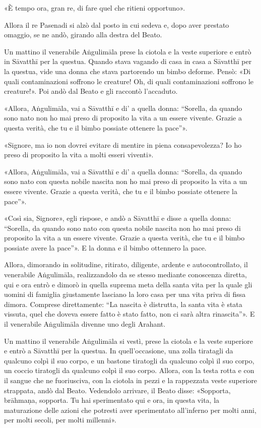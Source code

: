 «È tempo ora, gran re, di fare quel che ritieni opportuno».

Allora il re Pasenadi si alzò dal posto in cui sedeva e, dopo aver prestato
omaggio, se ne andò, girando alla destra del Beato.

Un mattino il venerabile Aṅgulimāla prese la ciotola e la veste superiore e
entrò in Sāvatthī per la questua. Quando stava vagando di casa in casa a
Sāvatthī per la questua, vide una donna che stava partorendo un bimbo deforme.
Pensò: «Di quali contaminazioni soffrono le creature! Oh, di quali
contaminazioni soffrono le creature!». Poi andò dal Beato e gli raccontò
l’accaduto.

«Allora, Aṅgulimāla, vai a Sāvatthī e di' a quella donna: “Sorella, da quando
sono nato non ho mai preso di proposito la vita a un essere vivente. Grazie a
questa verità, che tu e il bimbo possiate ottenere la pace”».

«Signore, ma io non dovrei evitare di mentire in piena consapevolezza? Io ho
preso di proposito la vita a molti esseri viventi».

«Allora, Aṅgulimāla, vai a Sāvatthī e di' a quella donna: “Sorella, da quando
sono nato con questa nobile nascita non ho mai preso di proposito la vita a un
essere vivente. Grazie a questa verità, che tu e il bimbo possiate ottenere la
pace”».

«Così sia, Signore», egli rispose, e andò a Sāvatthī e disse a quella donna:
“Sorella, da quando sono nato con questa nobile nascita non ho mai preso di
proposito la vita a un essere vivente. Grazie a questa verità, che tu e il bimbo
possiate avere la pace”». E la donna e il bimbo ottennero la pace.

Allora, dimorando in solitudine, ritirato, diligente, ardente e autocontrollato,
il venerabile Aṅgulimāla, realizzandolo da se stesso mediante conoscenza
diretta, qui e ora entrò e dimorò in quella suprema meta della santa vita per la
quale gli uomini di famiglia giustamente lasciano la loro casa per una vita
priva di fissa dimora. Comprese direttamente: “La nascita è distrutta, la santa
vita è stata vissuta, quel che doveva essere fatto è stato fatto, non ci sarà
altra rinascita”». E il venerabile Aṅgulimāla divenne uno degli Arahant.

Un mattino il venerabile Aṅgulimāla si vestì, prese la ciotola e la veste
superiore e entrò a Sāvatthī per la questua. In quell’occasione, una zolla
tiratagli da qualcuno colpì il suo corpo, e un bastone tiratogli da qualcuno
colpì il suo corpo, un coccio tiratogli da qualcuno colpì il suo corpo. Allora,
con la testa rotta e con il sangue che ne fuoriusciva, con la ciotola in pezzi e
la rappezzata veste superiore strappata, andò dal Beato. Vedendolo arrivare, il
Beato disse: «Sopporta, brāhmaṇa, sopporta. Tu hai sperimentato qui e ora, in
questa vita, la maturazione delle azioni che potresti aver sperimentato
all’inferno per molti anni, per molti secoli, per molti millenni».

